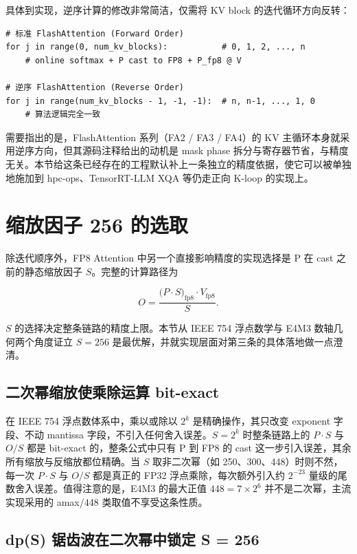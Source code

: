 具体到实现，逆序计算的修改非常简洁，仅需将 KV block 的迭代循环方向反转：

\begin{lstlisting}
# 标准 FlashAttention (Forward Order)
for j in range(0, num_kv_blocks):           # 0, 1, 2, ..., n
    # online softmax + P cast to FP8 + P_fp8 @ V

# 逆序 FlashAttention (Reverse Order)
for j in range(num_kv_blocks - 1, -1, -1):  # n, n-1, ..., 1, 0
    # 算法逻辑完全一致
\end{lstlisting}

需要指出的是，FlashAttention 系列（FA2 / FA3 / FA4）的 KV 主循环本身就采用逆序方向，但其源码注释给出的动机是 mask phase 拆分与寄存器节省，与精度无关。本节给这条已经存在的工程默认补上一条独立的精度依据，使它可以被单独地施加到 hpc-ops、TensorRT-LLM XQA 等仍走正向 K-loop 的实现上。

\section{缩放因子 256 的选取}

除迭代顺序外，FP8 Attention 中另一个直接影响精度的实现选择是 P 在 cast 之前的静态缩放因子 $S$。完整的计算路径为

\begin{equation*}
O = \frac{\big(P \cdot S\big)_{\text{fp8}} \cdot V_{\text{fp8}}}{S}.
\end{equation*}

$S$ 的选择决定整条链路的精度上限。本节从 IEEE 754 浮点数学与 E4M3 数轴几何两个角度证立 $S = 256$ 是最优解，并就实现层面对第三条的具体落地做一点澄清。

\subsection{二次幂缩放使乘除运算 bit-exact}

在 IEEE 754 浮点数体系中，乘以或除以 $2^k$ 是精确操作，其只改变 exponent 字段、不动 mantissa 字段，不引入任何舍入误差。$S = 2^k$ 时整条链路上的 $P \cdot S$ 与 $O / S$ 都是 bit-exact 的，整条公式中只有 P 到 FP8 的 cast 这一步引入误差，其余所有缩放与反缩放都位精确。当 $S$ 取非二次幂（如 250、300、448）时则不然，每一次 $P \cdot S$ 与 $O / S$ 都是真正的 FP32 浮点乘除，每次额外引入约 $2^{-23}$ 量级的尾数舍入误差。值得注意的是，E4M3 的最大正值 $448 = 7 \times 2^6$ 并不是二次幂，主流实现采用的 amax/448 类取值不享受这条性质。

\subsection{dp(S) 锯齿波在二次幂中锁定 S = 256}

